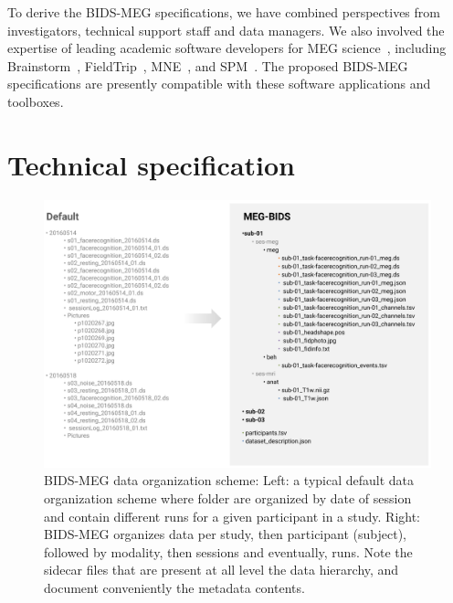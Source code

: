 To derive the BIDS-MEG specifications, we have combined perspectives from investigators, technical support staff and data managers. We also involved the expertise of leading academic software developers for MEG science~\citep{baillet2011academic}, including Brainstorm~\citep{tadel2011brainstorm}, FieldTrip~\citep{oostenveld2010fieldtrip}, MNE~\citep{mne}, and SPM~\citep{litvak2011eeg}. The proposed BIDS-MEG specifications are presently compatible with these software applications and toolboxes.

\section{Technical specification}
\label{sec:BIDS-MEG}

\begin{figure}[htb!]
\begin{center}
   \includegraphics[width=\linewidth]{figures/bids_organization.png}
\end{center}
   \caption[BIDS-MEG data organization scheme.]{BIDS-MEG data organization scheme: Left: a typical default data organization scheme where folder are organized by date of session and contain different runs for a given participant in a study. Right: BIDS-MEG organizes data per study, then participant (subject), followed by modality, then sessions and eventually, runs. Note the sidecar files that are present at all level the data hierarchy, and document conveniently the metadata contents.}
   \label{fig:BIDS-MEG-organization}
\end{figure}


